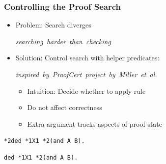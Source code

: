 \documentclass{beamer}
\def\highlightcolor{orange}
\newcommand{\com}[1]{\strut\hfil\strut\null\nobreak\hfill\hbox{{\itshape \color{black!50}#1}}\par}
\begin{document}
\begin{frame}[fragile]
    \frametitle{Controlling the Proof Search}
    \begin{itemize}
        \item Problem: Search diverges \com{searching harder than checking}
        \item Solution: Control search with helper predicates:
            \com{inspired by ProofCert project by Miller et al.}
            \begin{itemize}
                \item Intuition: Decide whether to apply rule
                \item Do not affect correctness
                \item Extra argument tracks aspects of proof state
            \end{itemize}
    \end{itemize}

    \vspace{1.5em}
     {\def\highlightcolor{white}\lstinline[language=ELPI]|*2ded *1X1 *2(and A B).|}


    \vspace{0.5em}
     \lstinline[language=ELPI]|ded *1X1 *2(and A B).|

% 
\end{frame}
\end{document}
